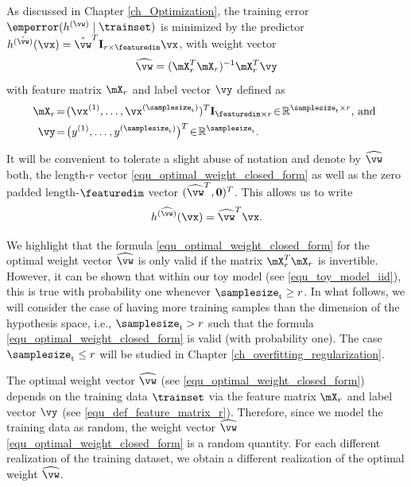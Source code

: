 \documentclass[12pt]{report}
\begin{document}
As discussed in Chapter \ref{ch_Optimization}, the training error $\emperror (h^{(\vw)} \mid \trainset)$ 
is minimized by the predictor $h^{(\hat{\vw})}(\vx) =  \hat{\vw}^{T} \mathbf{I}_{r \times \featuredim} \vx$, 
with weight vector 
\begin{equation}
\label{equ_optimal_weight_closed_form}
\widehat{\vw} =  (\mX^{T}_{r} \mX_{r})^{-1} \mX_{r}^{T} \vy
\end{equation} 
with feature matrix $\mX_{r}$ and label vector $\vy$ defined as 
\begin{align}
\label{equ_def_feature_matrix_r}
\mX_{r}& \!=\!(\vx^{(1)},\ldots,\vx^{(\samplesize_{\rm t})})^{T} \mathbf{I}_{\featuredim \times r}\!\in\!\mathbb{R}^{\samplesize_{\rm t} \times r} \mbox{, and }  \nonumber \\
\vy& \!=\!\big(y^{(1)},\ldots,y^{(\samplesize_{\rm t})}\big)^{T}\!\in\!\mathbb{R}^{\samplesize_{\rm t}}.
\end{align} 

It will be convenient to tolerate a slight abuse of notation and denote by $\widehat{\vw}$ 
both, the length-$r$ vector \eqref{equ_optimal_weight_closed_form} as well as the zero 
padded length-$\featuredim$ vector $(\widehat{\vw}^{T},\mathbf{0})^{T}$. 
This allows us to write %
\begin{equation} 
h^{(\widehat{\vw})}(\vx) = \widehat{\vw}^{T} \vx. 
\end{equation}

We highlight that the formula \eqref{equ_optimal_weight_closed_form} 
for the optimal weight vector $\widehat{\vw}$ is only valid if the matrix 
$\mX^{T}_{r} \mX_{r}$ is invertible. However, it can be shown that within 
our toy model (see \eqref{equ_toy_model_iid}), this is true with probability 
one whenever $\samplesize_{\rm t} \geq r$. In what follows, we will consider 
the case of having more training samples than the dimension of the 
hypothesis space, i.e., $\samplesize_{\rm t} > r$ such that the formula 
\eqref{equ_optimal_weight_closed_form} is valid (with probability one). 
The case $\samplesize_{\rm t} \leq r$ will be studied in Chapter \ref{ch_overfitting_regularization}.

The optimal weight vector $\widehat{\vw}$ (see \eqref{equ_optimal_weight_closed_form}) 
depends on the training data $\trainset$ via the feature matrix $\mX_{r}$ 
and label vector $\vy$ (see \eqref{equ_def_feature_matrix_r}). Therefore, 
since we model the training data as random, the weight vector $\widehat{\vw}$ 
\eqref{equ_optimal_weight_closed_form} is a random quantity. For each different 
realization of the training dataset, we obtain a different realization of the 
optimal weight $\widehat{\vw}$. 
\end{document}
